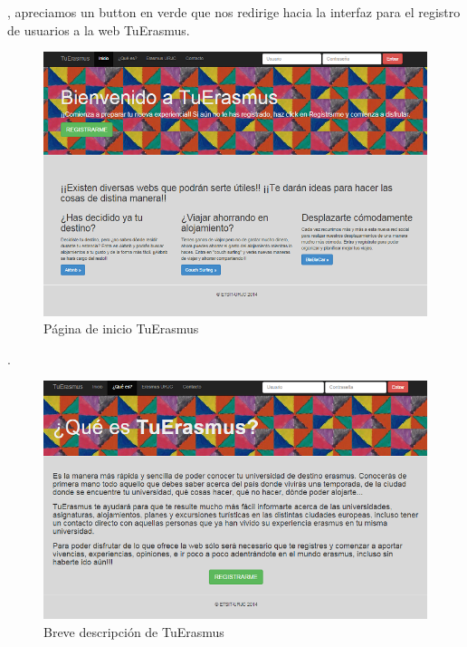 \textit{}, apreciamos un button en verde que nos redirige hacia la interfaz para el registro de usuarios a la web TuErasmus.\\
\begin{figure}[htbp]
	
	\centering
	\includegraphics[scale=0.5]{./Figuras/tuerasmusPages/publicPages/index.png}
	\caption{P\'agina de inicio TuErasmus}
	\label{fig:index}
	
\end{figure}

\textit{}.\\
\begin{figure}[htbp]
	
	\centering
	\includegraphics[scale=0.5]{./Figuras/tuerasmusPages/publicPages/howto.png}
	\caption{Breve descripci\'on de TuErasmus}
	\label{fig:howto}
	
\end{figure}

